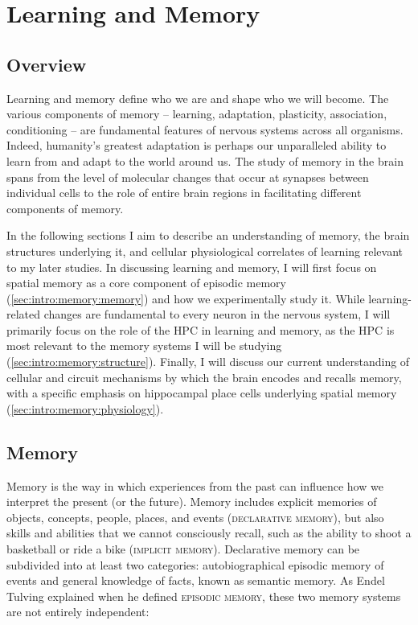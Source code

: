 \acresetall
\chapter{Learning and Memory}
\label{ch:intro:memory}
\section*{Overview}
Learning and memory define who we are and shape who we will become.
The various components of memory -- learning, adaptation, plasticity, association, conditioning -- are fundamental features of nervous systems across all organisms.
Indeed, humanity's greatest adaptation is perhaps our unparalleled ability to learn from and adapt to the world around us.
The study of memory in the brain spans from the level of molecular changes that occur at synapses between individual cells to the role of entire brain regions in facilitating different components of memory.

In the following sections I aim to describe an understanding of memory, the brain structures underlying it, and cellular physiological correlates of learning relevant to my later studies.
In discussing learning and memory, I will first focus on spatial memory as a core component of episodic memory (\autoref{sec:intro:memory:memory}) and how we experimentally study it.
While learning-related changes are fundamental to every neuron in the nervous system, I will primarily focus on the role of the \ac{HPC} in learning and memory, as the \ac{HPC} is most relevant to the memory systems I will be studying (\autoref{sec:intro:memory:structure}).
Finally, I will discuss our current understanding of cellular and circuit mechanisms by which the brain encodes and recalls memory, with a specific emphasis on hippocampal place cells underlying spatial memory (\autoref{sec:intro:memory:physiology}).

\section{Memory}
\label{sec:intro:memory:memory}
Memory is the way in which experiences from the past can influence how we interpret the present (or the future).
Memory includes explicit memories of objects, concepts, people, places, and events (\textsc{declarative memory}), but also skills and abilities that we cannot consciously recall, such as the ability to shoot a basketball or ride a bike (\textsc{implicit memory}).
Declarative memory can be subdivided into at least two categories: autobiographical episodic memory of events and general knowledge of facts, known as semantic memory.
As Endel Tulving explained when he defined \textsc{episodic memory}, these two memory systems are not entirely independent:


